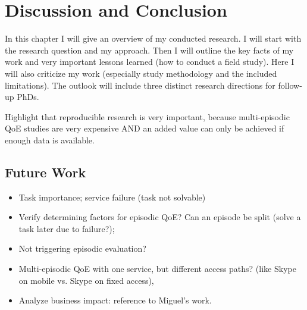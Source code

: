 \chapter{Discussion and Conclusion}\label{chap:09}
\begin{chapter-abstract}
In this chapter I will give an overview of my conducted research.
I will start with the research question and my approach.
Then I will outline the key facts of my work and very important lessons learned (how to conduct a field study).
Here I will also criticize my work (especially study methodology and the included limitations).
The outlook will include three distinct research directions for follow-up PhDs.

Highlight that reproducible research is very important, because multi-episodic QoE studies are very expensive AND an added value can only be achieved if enough data is available.
\end{chapter-abstract}

\section{Future Work}
\begin{itemize}
\item Task importance; service failure (task not solvable)
\item Verify determining factors for episodic QoE? Can an episode be split (solve a task later due to failure?);
\item Not triggering episodic evaluation?
\item Multi-episodic QoE with one service, but different access paths? (like Skype on mobile vs. Skype on fixed access), 

\item Analyze business impact: reference to Miguel's work.
\end{itemize}